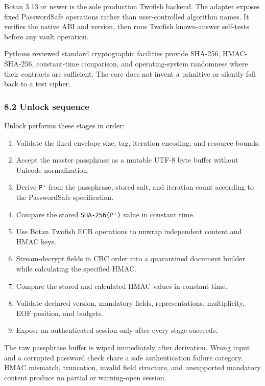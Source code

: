\documentclass[
  letterpaper,
]{article}
\newcommand{\passthrough}[1]{#1}
\providecommand{\tightlist}{%
  \setlength{\itemsep}{0pt}\setlength{\parskip}{0pt}}
\begin{document}
Botan 3.13 or newer is the sole production Twofish backend. The adapter exposes fixed PasswordSafe operations rather
than user-controlled algorithm names. It verifies the native ABI and version, then runs Twofish known-answer self-tests
before any vault operation.

Python\textquotesingle s reviewed standard cryptographic facilities provide SHA-256, HMAC-SHA-256, constant-time
comparison, and operating-system randomness where their contracts are sufficient. The core does not invent a primitive
or silently fall back to a test cipher.

\subsubsection{8.2 Unlock sequence}\label{82-unlock-sequence}

Unlock performs these stages in order:

\begin{enumerate}
\def\labelenumi{\arabic{enumi}.}
\tightlist
\item
  Validate the fixed envelope size, tag, iteration encoding, and resource bounds.
\item
  Accept the master passphrase as a mutable UTF-8 byte buffer without Unicode normalization.
\item
  Derive \passthrough{\lstinline!P'!} from the passphrase, stored salt, and iteration count according to the
  PasswordSafe specification.
\item
  Compare the stored \nolinkurl{SHA-256(P')} value in constant time.
\item
  Use Botan Twofish ECB operations to unwrap independent content and HMAC keys.
\item
  Stream-decrypt fields in CBC order into a quarantined document builder while calculating the specified HMAC.
\item
  Compare the stored and calculated HMAC values in constant time.
\item
  Validate declared version, mandatory fields, representations, multiplicity, EOF position, and budgets.
\item
  Expose an authenticated session only after every stage succeeds.
\end{enumerate}

The raw passphrase buffer is wiped immediately after derivation. Wrong input and a corrupted password check share a safe
authentication failure category. HMAC mismatch, truncation, invalid field structure, and unsupported mandatory content
produce no partial or warning-open session.
\end{document}
